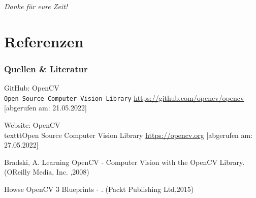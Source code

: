 \documentclass{beamer}
\begin{document}
\begin{frame}
	\centering \Large
	\emph{Danke für eure Zeit!}
\end{frame}

\section[Quellen]{Referenzen}

\begin{frame}\frametitle{Quellen \& Literatur}
	\begin{thebibliography}{9}
		GitHub: OpenCV
		\\\texttt{Open Source Computer Vision Library}
		\url{https://github.com/opencv/opencv}
		[abgerufen am: 21.05.2022]
		
		Website: OpenCV
		\\texttt{Open Source Computer Vision Library}
		\url{https://opencv.org}
		[abgerufen am: 27.05.2022]
		
		Bradski, A. Learning OpenCV - Computer Vision with the OpenCV Library. (OReilly Media, Inc. ,2008)
		
		Howse OpenCV 3 Blueprints - . (Packt Publishing Ltd,2015)
	\end{thebibliography}
\end{frame}
\end{document}

